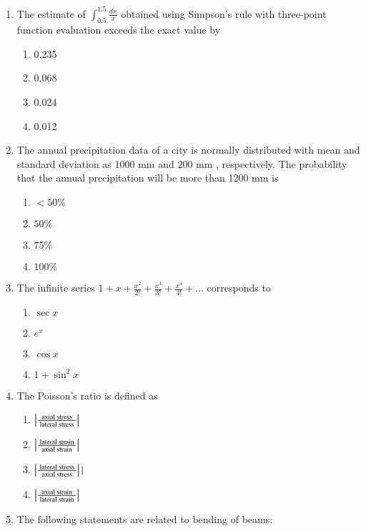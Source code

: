 \documentclass[journal]{IEEEtran}
\begin{document}
\begin{enumerate}
    

 
    \item The estimate of $\int_{0.5}^{1.5} \frac{dx}{x}$ obtained using Simpson's rule with three-point function evaluation exceeds the exact value by
    \begin{multicols}{4}
			\begin{enumerate}
\item 0.235
\item 0.068
\item 0.024
\item 0.012
        \end{enumerate}
		\end{multicols}
  \item The annual precipitation data of a city is normally distributed with mean and standard deviation as 1000 mm and 200 mm , respectively. The probability that the annual precipitation will be more than 1200 mm is
   \begin{multicols}{4}
			\begin{enumerate}

\item  $<50 \%$
\item $50 \%$
\item $75 \%$
\item $100 \%$
        \end{enumerate}
		\end{multicols}
  \item The infinite series $1+x+\frac{x^{2}}{2!}+\frac{x^{3}}{3!}+\frac{x^{4}}{4!}+\ldots$ corresponds to
   \begin{multicols}{4}
			\begin{enumerate}
\item  $\sec x$
\item ${e}^{x}$
\item $\cos x$
\item $1+\sin ^{2} x$

  \end{enumerate}
		\end{multicols}
  \item The Poisson's ratio is defined as
   \begin{multicols}{4}
			\begin{enumerate}
\item $\left\vert\frac{\text { axial stress }}{\text { lateral stress }}\right\vert$
\item  $\left\vert\frac{\text { lateral strain }}{\text { axial strain }}\right\vert$
\item $\left\vert\frac{\text { lateral stress }}{\text { axial stress }}\right\vert|$
\item $\left\vert\frac{\text { axial strain }}{\text { lateral strain }}\right\vert$
   \end{enumerate}
		\end{multicols}
  \item The following statements are related to bending of beams:


\end{enumerate}
\end{document}

